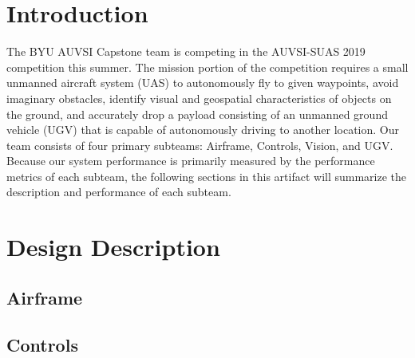 \documentclass[]{auvsi_doc}
\begin{document}
\begin{AUVSITitlePage}
\begin{artifacttable}
\end{artifacttable}
\end{AUVSITitlePage}

\section{Introduction}

The BYU AUVSI Capstone team is competing in the AUVSI-SUAS 2019 competition this summer. The mission portion of the competition requires a small unmanned aircraft system (UAS) to autonomously fly to given waypoints, avoid imaginary obstacles, identify visual and geospatial characteristics of objects on the ground, and accurately drop a payload consisting of an unmanned ground vehicle (UGV) that is capable of autonomously driving to another location. Our team consists of four primary subteams: Airframe, Controls, Vision, and UGV. Because our system performance is primarily measured by the performance metrics of each subteam, the following sections in this artifact will summarize the description and performance of each subteam.

\section{Design Description}

\subsection{Airframe}
\subsection{Controls}
\end{document}
